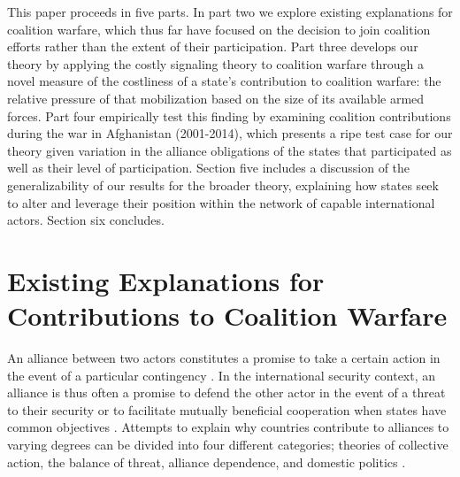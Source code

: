 \documentclass[12pt,letterpaper]{article}
\begin{document}
	This paper proceeds in five parts. In part two we explore existing explanations for coalition warfare, which thus far have focused on the decision to join coalition efforts rather than the extent of their participation. Part three develops our theory by applying the costly signaling theory to coalition warfare through a novel measure of the costliness of a state's contribution to coalition warfare: the relative pressure of that mobilization based on the size of its available armed forces. Part four empirically test this finding by examining coalition contributions during the war in Afghanistan (2001-2014), which presents a ripe test case for our theory given variation in the alliance obligations of the states that participated as well as their level of participation. Section five includes a discussion of the generalizability of our results for the broader theory, explaining how states seek to alter and leverage their position within the network of capable international actors. Section six concludes.

\section{Existing Explanations for Contributions to Coalition Warfare}
	An alliance between two actors constitutes a promise to take a certain action in the event of a particular contingency \citep[526]{altfeld_decisionallytheory_1984}. In the international security context, an alliance is thus often a promise to defend the other actor in the event of a threat to their security \citep{waltz_theoryinternationalpolitics_1979, walt_originsalliance_1987} or to facilitate mutually beneficial cooperation when states have common objectives \citep{keohane_hegemonycooperationdiscord_1984, wolford_showing_2014}. Attempts to explain why countries contribute to alliances to varying degrees can be divided into four different categories; theories of collective action, the balance of threat, alliance dependence, and domestic politics \citep{bennett_burdensharingpersiangulf_1994, haesebrouck_democraticparticipationair_2016}.
	
\end{document}
